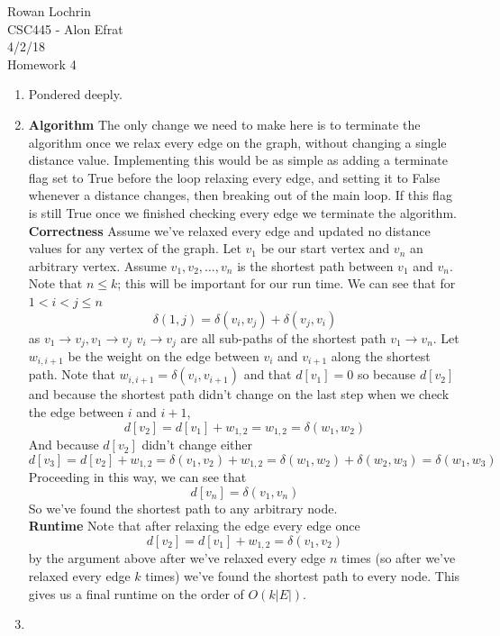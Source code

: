\documentclass[11pt]{article}
\begin{document}
\begin{flushleft}
	Rowan Lochrin \\
	CSC445 - Alon Efrat\\
	4/2/18 \\
	Homework 4
\end{flushleft}
\begin{enumerate}
		\item Pondered deeply.
		\item \textbf{Algorithm} The only change we need to make here is to
		terminate the algorithm once we relax every edge on the graph,
		without changing a single distance value. Implementing this
		would be as simple as adding a terminate flag set to True 
		before the loop relaxing every edge, and setting it to False
		whenever a distance changes, then breaking out of the main loop.
		If this flag is still True once we finished checking every edge
		we terminate the algorithm.\\
		\textbf{Correctness}
		Assume we've relaxed every edge and updated no distance values
		for any vertex of the graph. Let $v_1$ be our start vertex and
		$v_n$ an arbitrary vertex. Assume $v_1, v_2,...,v_n$ is
		the shortest path between $v_1$ and $v_n$. Note that
		$n \leq k$; this will be important for our run time.
		 We can see that for $1<i<j\leq n$
		 $$\delta(1,j) = \delta(v_i,v_j) + \delta(v_j,v_i)$$ 
		 as $v_1 \rightarrow v_j,v_1 \rightarrow v_j$ $v_i \rightarrow
		 v_j$ are all sub-paths of the shortest path $v_1 \rightarrow
		 v_n$. 
		Let $w_{i,i+1}$ be the weight on the edge between $v_i$ and
		$v_{i+1} $ along the shortest path. Note that $w_{i,i+1} =
		\delta(v_i,v_{i+1})$
		 and that $d[v_1] = 0$ so because $d[v_2]$ and because the
		 shortest path 
		didn't change on the last step when we check the edge between
		$i$ and $i+1$, $$d[v_2] = d[v_1] + w_{1,2} = w_{1,2} =
		\delta(w_1,w_2) $$ And because $d[v_2]$ didn't change either
		$$d[v_3] = d[v_2] + w_{1,2} = \delta(v_1,v_2) + w_{1,2} =
		\delta(w_1,w_2) + \delta(w_2,w_3) = \delta(w_1,w_3) $$
		Proceeding in this way, we can see that
		$$d[v_n] = \delta(v_1,v_n)$$
		So we've found the shortest path to any arbitrary node.\\
		\textbf{Runtime}
		Note that after relaxing the edge every edge once $$d[v_2] =
		d[v_1] + w_{1,2} = \delta(v_1,v_2)$$ by the argument above
		after we've relaxed every edge $n$ times (so after we've relaxed
		every edge $k$ times) we've found the shortest path to every
		node. This gives us a final runtime on the order of $O(k|E|)$.
		\item 

\end{enumerate}
\end{document}
